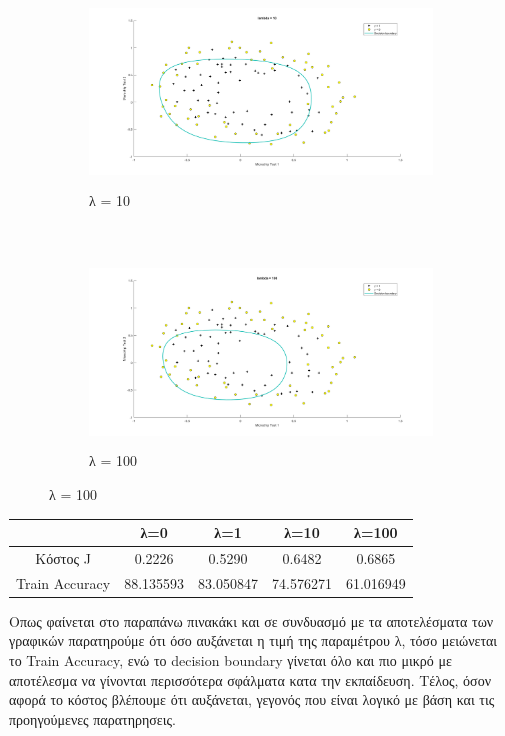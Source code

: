 \documentclass{article}
\begin{document}
\begin{figure}[h!]
		\begin{subfigure}[t]{0.5\textwidth}
			\centering
			\includegraphics[height=5cm, width=\linewidth]{../exercise2_2/images/ex2_lambda_10.png}
			\caption{λ = 10}
		\end{subfigure}%
		~
		\begin{subfigure}[t]{0.5\textwidth}
			\centering
			\includegraphics[height=5cm, width=\linewidth]{../exercise2_2/images/ex2_lambda_100.png}
			\caption{λ = 100}
		\end{subfigure}
	\end{figure}
	
	\begin{table}[!ht]  
		\centering
		\begin{tabular}{|c|c|c|c|c|}
			\cline{2-5}
			\multicolumn{1}{c|}{} & λ=0 & λ=1 & λ=10  & λ=100\\ \hline
			Κόστος J & 0.2226  & 0.5290   & 0.6482 & 0.6865  \\ \hline
			Train Accuracy & 88.135593 & 83.050847   & 74.576271 & 61.016949 \\ \hline
		\end{tabular}
	\end{table}
	
	\noindent
	Oπως φαίνεται στο παραπάνω πινακάκι και σε συνδυασμό με τα αποτελέσματα των γραφικών παρατηρούμε ότι όσο αυξάνεται η τιμή της παραμέτρου λ, τόσο μειώνεται το Train Accuracy, ενώ το decision boundary γίνεται όλο και πιο μικρό με αποτέλεσμα να γίνονται περισσότερα σφάλματα κατα την εκπαίδευση. Τέλος, όσον αφορά το κόστος βλέπουμε ότι αυξάνεται, γεγονός που είναι λογικό με βάση και τις προηγούμενες παρατηρησεις.
	
\end{document}
